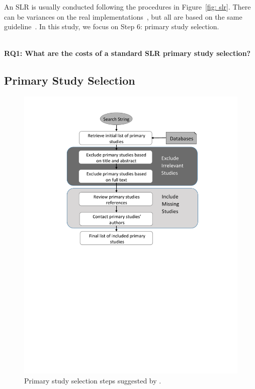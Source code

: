 \documentclass[final,twocolumn,5p]{elsarticle}
\theoremstyle{break}
\begin{document}
An SLR is usually conducted following the procedures in Figure~\ref{fig:
  slr}. There can be variances on the real
implementations~\cite{wahono2015systematic,malhotra2015systematic,radjenovic2013software,unterkalmsteiner2012evaluation,hall2012systematic},
but all are based on the same guideline~\cite{keele2007guidelines}. In this
study, we focus on Step 6: primary study selection.

\ \\ \noindent
{\bf RQ1: What are the costs of a standard SLR primary study selection?} 

\subsection{Primary Study Selection}
\label{subsect: Primary Study Selection}

\begin{figure}[ht]
    \centering
    \includegraphics[width=\linewidth]{primary_study_selection.pdf}
    \caption{Primary study selection steps suggested by \cite{keele2007guidelines}.}
    \label{fig: prime}
\end{figure}
\end{document}
